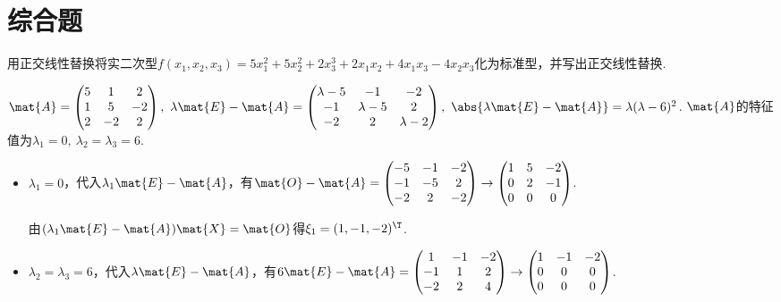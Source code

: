 \section{综合题}
\begin{problem}
    用正交线性替换将实二次型$f(x_1,x_2,x_3)=5x_1^2+5x_2^2+2x_3^3+2x_1x_2+4x_1x_3-4x_2x_3$化为标准型，并写出正交线性替换.
\end{problem}
\begin{solution}
    $\mat{A}=\begin{pmatrix}
        5 & 1 & 2\\
        1 & 5 & -2\\
        2 & -2 & 2
    \end{pmatrix},\ \lambda\mat{E}-\mat{A}=\begin{pmatrix}
        \lambda-5 & -1 & -2\\
        -1 & \lambda-5 & 2\\
        -2 & 2 & \lambda-2
    \end{pmatrix},\ \abs{\lambda\mat{E}-\mat{A}}=\lambda(\lambda-6)^2$. $\mat{A}$的特征值为$\lambda_1=0,\ \lambda_2=\lambda_3=6$.
\begin{itemize}
    \item $\lambda_1=0$，代入$\lambda_1\mat{E}-\mat{A}$，有$\mat{O}-\mat{A}=\begin{pmatrix}
        -5 & -1 & -2\\
        -1 & -5 & 2\\
        -2 & 2 & -2
    \end{pmatrix}\to
    \begin{pmatrix}
        1 & 5 & -2\\
        0 & 2 & -1\\
        0 & 0 & 0
    \end{pmatrix}$.
    
    由$(\lambda_1\mat{E}-\mat{A})\mat{X}=\mat{O}$得$\xi_1=(1,-1,-2)^\T$.
    \item $\lambda_2=\lambda_3=6$，代入$\lambda\mat{E}-\mat{A}$，有$6\mat{E}-\mat{A}=\begin{pmatrix}
        1 & -1 & -2\\
        -1 & 1 & 2\\
        -2 & 2 & 4
    \end{pmatrix}\to
    \begin{pmatrix}
        1 & -1 & -2\\
        0 & 0 & 0\\
        0 & 0 & 0
    \end{pmatrix}$.
    

\end{itemize}
\end{solution}
